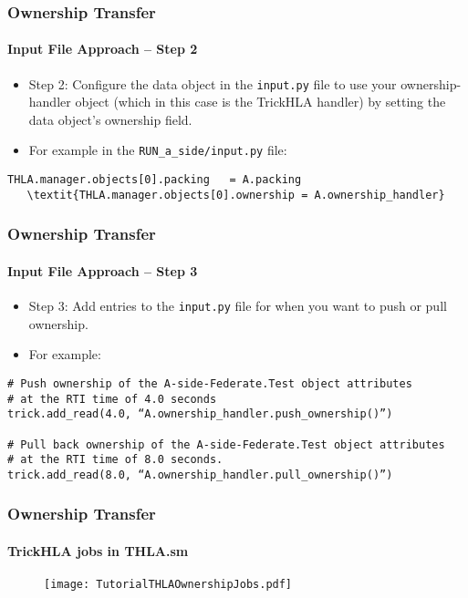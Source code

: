    \begin{frame}[fragile]
      \frametitle{Ownership Transfer}
      \framesubtitle{Input File Approach – Step 2}
      \begin{itemize}
         \item Step 2: Configure the data object in the \texttt{input.py} file
         to use your ownership-handler object (which in this case is the
         TrickHLA handler) by setting the data object’s ownership field.
         \item For example in the \texttt{RUN\_a\_side/input.py} file:
      \end{itemize}
      \vspace{0.2cm}
\begin{Verbatim}[frame=single, fontsize=\scriptsize, commandchars=\\\{\}]
   THLA.manager.objects[0].packing   = A.packing
   \textit{THLA.manager.objects[0].ownership = A.ownership_handler}
\end{Verbatim}
   \end{frame}

   \begin{frame}[fragile]
      \frametitle{Ownership Transfer}
      \framesubtitle{Input File Approach – Step 3}
      \begin{itemize}
         \item Step 3: Add entries to the \texttt{input.py} file for when you
         want to push or pull ownership.
         \item For example:
      \end{itemize}
      \vspace{0.2cm}
\begin{Verbatim}[frame=single, fontsize=\footnotesize]
# Push ownership of the A-side-Federate.Test object attributes
# at the RTI time of 4.0 seconds
trick.add_read(4.0, “A.ownership_handler.push_ownership()”)

# Pull back ownership of the A-side-Federate.Test object attributes
# at the RTI time of 8.0 seconds.
trick.add_read(8.0, “A.ownership_handler.pull_ownership()”)
\end{Verbatim}
   \end{frame}

   \begin{frame}
      \frametitle{Ownership Transfer}
      \framesubtitle{TrickHLA jobs in THLA.sm}
      \begin{figure}
      \texttt{[image: TutorialTHLAOwnershipJobs.pdf]}
      \end{figure}
   \end{frame}

